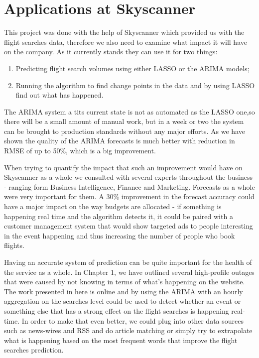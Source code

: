 \documentclass[minf,twoside,singlespacing,parskip,frontabs,notimes,12pt]{infthesis} %
\begin{document}
\section{Applications at Skyscanner}

This project was done with the help of Skyscanner which provided us with the flight searches data, therefore we also need to examine what impact it will have on the company. As it currently stands they can use it for two things:
\begin{enumerate}
\item Predicting flight search volumes using either LASSO or the ARIMA models;
\item Running the algorithm to find change points in the data and by using LASSO find out what has happened.
\end{enumerate}

The ARIMA system a tits current state is not as automated as the LASSO one,so there will be a small amount of manual work, but in a week or two the system can be brought to production standards without any major efforts. As we have shown the quality of the ARIMA forecasts is much better with reduction in RMSE of up to 50\%, which is a big improvement.

When trying to quantify the impact that such an improvement would have on Skyscanner as a whole we consulted with several experts throughout the business - ranging form Business Intelligence, Finance and Marketing. Forecasts as a whole were very important for them. A 30\% improvement in the forecast accuracy could have a major impact on the way budgets are allocated - if something is happening real time and the algorithm detects it, it could be paired with a customer management system that would show targeted ads to people interesting in the event happening and thus increasing the number of people who book flights.

Having an accurate system of prediction can be quite important for the health of the service as a whole. In Chapter 1, we have outlined several high-profile outages that were caused by not knowing in terms of what's happening on the website. The work presented in here is online and by using the ARIMA with an hourly aggregation on the searches level could be used to detect whether an event or something else that has a strong effect on the flight searches is happening real-time. In order to make that even better, we could plug into other data sources such as news-wires and RSS and do article matching or simply try to extrapolate what is happening based on the most frequent words that improve the flight searches prediction.
\end{document}
